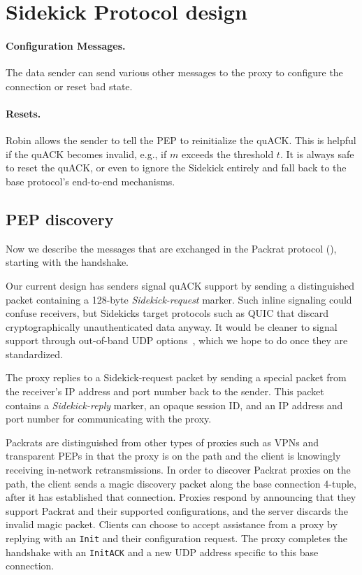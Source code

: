 \section{Sidekick Protocol design}
\label{sec:sidekick:protocol}

\paragraph{Configuration Messages.}

The data sender can send various other messages to the proxy
to configure the connection or reset bad state.

\paragraph{Resets.}
Robin allows the sender to tell the PEP to reinitialize the quACK.
This is helpful if the quACK becomes
invalid, e.g., if $m$ exceeds the threshold $t$. It is
always safe to reset the quACK, or even to ignore the Sidekick entirely and
fall back to the base protocol's end-to-end mechanisms.

\subsection{PEP discovery}
\label{sec:sidekick:protocol:discovery}



Now we describe the messages that are exchanged in the
Packrat protocol (), starting with the handshake.

Our current design has senders signal quACK support by sending a
distinguished packet containing a 128-byte \emph{Sidekick-request} marker.  Such
inline signaling could confuse receivers, but Sidekicks target
protocols such as QUIC that discard cryptographically unauthenticated
data anyway.  It would be cleaner to signal support through
out-of-band UDP options~\cite{ietf-tsvwg-udp-options-28}, which we hope to do
once they are standardized.

The proxy replies to a Sidekick-request packet by sending a special packet
from the receiver's IP address and port number back to the sender.
This packet contains a \emph{Sidekick-reply} marker, an opaque session ID, and an
IP address and port number for communicating with the proxy.

Packrats are distinguished from other types of proxies such as VPNs and
transparent PEPs in that the proxy is on the path and the client is knowingly
receiving in-network retransmissions. In order to discover Packrat proxies on the
path, the client sends a magic discovery packet along the base connection
4-tuple, after it has established that connection. Proxies respond by
announcing that they support Packrat and their supported configurations, and the
server discards the invalid magic packet. Clients can choose to accept
assistance from a proxy by replying with an \texttt{Init} and their
configuration request. The proxy completes the handshake with an \texttt
{InitACK} and a new UDP address specific to this base connection.

